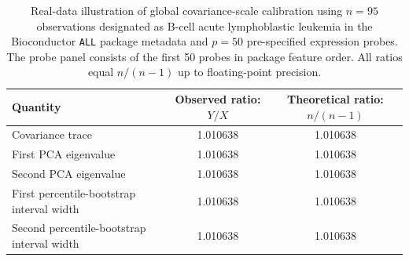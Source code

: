\begin{table}[htbp]
\centering
\small
\caption{Real-data illustration of global covariance-scale calibration using $n=95$ observations designated as B-cell acute lymphoblastic leukemia in the Bioconductor \texttt{ALL} package metadata and $p=50$ pre-specified expression probes. The probe panel consists of the first 50 probes in package feature order. All ratios equal $n/(n-1)$ up to floating-point precision.}
\label{tab:real_data_covariance_pca}
\begin{tabular}{lcc}
\hline\hline
\textbf{Quantity} & \textbf{Observed ratio: $Y/X$} & 
\textbf{Theoretical ratio: $n/(n-1)$} \\
\hline
Covariance trace & 1.010638 & 1.010638 \\
First PCA eigenvalue & 1.010638 & 1.010638 \\
Second PCA eigenvalue & 1.010638 & 1.010638 \\
First percentile-bootstrap interval width & 1.010638 & 1.010638 \\
Second percentile-bootstrap interval width & 1.010638 & 1.010638 \\
\hline\hline
\end{tabular}
\end{table}
